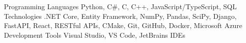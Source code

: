 

\begin{cvskills}
    \cvskill
        {Programming Languages}
        {Python, C\#, C, C++, JavaScript/TypeScript, SQL}
    \cvskill
        {Technologies}
        {.NET Core, Entity Framework, NumPy, Pandas, SciPy, Django, FastAPI, React, RESTful APIs, CMake, Git, GitHub, Docker, Microsoft Azure}
    \cvskill
        {Development Tools}
        {Visual Studio, VS Code, JetBrains IDEs}

\end{cvskills}
